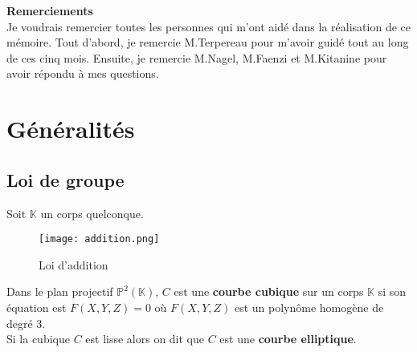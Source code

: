 \documentclass[a4paper]{article}
\begin{document}
\begin{figure}[!h]
\begin{center}
\end{center}
\end{figure}

\noindent \textbf{Remerciements}
\\
Je voudrais remercier toutes les personnes qui m'ont aidé dans la réalisation de ce mémoire.
Tout d'abord, je remercie M.Terpereau pour m'avoir guidé tout au long de ces cinq mois. Ensuite, je remercie M.Nagel, M.Faenzi et M.Kitanine pour avoir répondu à mes questions.


\newpage

\section{Généralités}
\subsection{Loi de groupe}
\noindent Soit $\mathbb{K}$ un corps quelconque.
\begin{figure}[h]
\centering
\texttt{[image: addition.png]}
\caption{Loi d'addition}
\label{neutre}
\end{figure} 

\begin{definition}
Dans le plan projectif $\mathbb{P}^2(\mathbb{K})$, $C$ est une \textbf{courbe cubique} sur un corps $\mathbb{K}$ si son équation est $F(X,Y,Z)=0$ où $F(X,Y,Z)$ est un polynôme homogène de degré 3. \\
Si la cubique $C$ est lisse alors on dit que $C$ est une \textbf{courbe elliptique}.
\end{definition}
\end{document}
